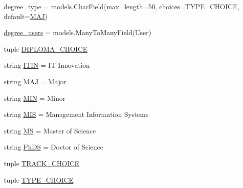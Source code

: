 \begin{DoxyCompactItemize}
\item 
\mbox{\hyperlink{classmavAgenda_1_1landing_1_1models_1_1Degree_ab2449e2bd027a88e4f33bdb6b51fbeee}{degree\+\_\+type}} = models.\+Char\+Field(max\+\_\+length=50, choices=\mbox{\hyperlink{classmavAgenda_1_1landing_1_1models_1_1Degree_a4c31d35cc89c513e49c470efde071e46}{T\+Y\+P\+E\+\_\+\+C\+H\+O\+I\+CE}}, default=\mbox{\hyperlink{classmavAgenda_1_1landing_1_1models_1_1Degree_a9ad9b30d21e6126009eb630f7c898ebe}{M\+AJ}})
\item 
\mbox{\hyperlink{classmavAgenda_1_1landing_1_1models_1_1Degree_aa3d798946f88fbb7a837f87ab263bd86}{degree\+\_\+users}} = models.\+Many\+To\+Many\+Field(User)
\item 
tuple \mbox{\hyperlink{classmavAgenda_1_1landing_1_1models_1_1Degree_a3ff221c690ef27bb964e725770d3bc9f}{D\+I\+P\+L\+O\+M\+A\+\_\+\+C\+H\+O\+I\+CE}}
\item 
string \mbox{\hyperlink{classmavAgenda_1_1landing_1_1models_1_1Degree_acfcc1fd31eead8c418c5a40eca903eda}{I\+T\+IN}} = \textquotesingle{}IT Innovation\textquotesingle{}
\item 
string \mbox{\hyperlink{classmavAgenda_1_1landing_1_1models_1_1Degree_a9ad9b30d21e6126009eb630f7c898ebe}{M\+AJ}} = \textquotesingle{}Major\textquotesingle{}
\item 
string \mbox{\hyperlink{classmavAgenda_1_1landing_1_1models_1_1Degree_ac9867d21a7f77bb1603c7470055feabb}{M\+IN}} = \textquotesingle{}Minor\textquotesingle{}
\item 
string \mbox{\hyperlink{classmavAgenda_1_1landing_1_1models_1_1Degree_a05332bea6506a7346bac1a5ea798a077}{M\+IS}} = \textquotesingle{}Management Information Systems\textquotesingle{}
\item 
string \mbox{\hyperlink{classmavAgenda_1_1landing_1_1models_1_1Degree_a664d7c2dee725afcfa3e232a1a2c406e}{MS}} = \textquotesingle{}Master of Science\textquotesingle{}
\item 
string \mbox{\hyperlink{classmavAgenda_1_1landing_1_1models_1_1Degree_abec6014b9ea3360cff8d645daa02a244}{Ph\+DS}} = \textquotesingle{}Doctor of Science\textquotesingle{}
\item 
tuple \mbox{\hyperlink{classmavAgenda_1_1landing_1_1models_1_1Degree_a8f41a44472524786c537c409825c9946}{T\+R\+A\+C\+K\+\_\+\+C\+H\+O\+I\+CE}}
\item 
tuple \mbox{\hyperlink{classmavAgenda_1_1landing_1_1models_1_1Degree_a4c31d35cc89c513e49c470efde071e46}{T\+Y\+P\+E\+\_\+\+C\+H\+O\+I\+CE}}
\end{DoxyCompactItemize}


